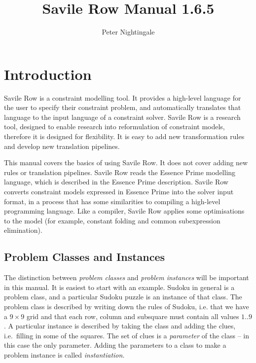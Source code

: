 \documentclass[a4paper]{article}
\newcommand{\eprime}{{\sc Essence Prime}\xspace}
\newcommand{\savilerow}{{\sc Savile Row}\xspace}
\newcommand{\version}{1.6.5\xspace}
\begin{document}
\title{\savilerow Manual \version}

\author{Peter Nightingale}

\date{}

\maketitle


\section{Introduction}

\savilerow is a constraint modelling tool. It provides a 
high-level language for the user to specify their constraint problem, and 
automatically translates that language to the input language of a constraint 
solver. \savilerow is a research tool, designed to enable research into 
reformulation of constraint models, therefore it is designed for flexibility. 
It is easy to add new transformation rules and develop new translation pipelines. 

This manual covers the basics of using \savilerow. It does not cover adding
new rules or translation pipelines. 
\savilerow reads the \eprime modelling language, which is described in the 
\eprime description. \savilerow converts constraint models expressed in \eprime 
into the solver input format, in a process that has some similarities to 
compiling a high-level programming language. Like a compiler, \savilerow applies
some optimisations to the model (for example, constant folding and common subexpression elimination).  



\subsection{Problem Classes and Instances}

The distinction between \textit{problem classes} and \textit{problem instances} 
will be important in this manual. It is easiest to start with an example. 
Sudoku in general is a problem class, and a particular Sudoku puzzle is an 
instance of that class. The problem class is described by writing down the 
rules of Sudoku, i.e. that we have a $9 \times 9$ grid and that each row, 
column and subsquare must contain all values $1..9$. A particular instance is 
described by taking the class and adding the clues, i.e.\ filling in some of 
the squares. The set of clues is a \textit{parameter} of the class -- in this
case the only parameter. Adding the parameters to a class to make a problem 
instance is called \textit{instantiation}. 
\end{document}
